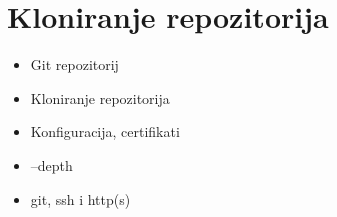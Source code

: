 \chapter*{Kloniranje repozitorija}

\begin{itemize}
   \item Git repozitorij
   \item Kloniranje repozitorija
   \item Konfiguracija, certifikati
   \item --depth
   \item git, ssh i http(s)
\end{itemize}


